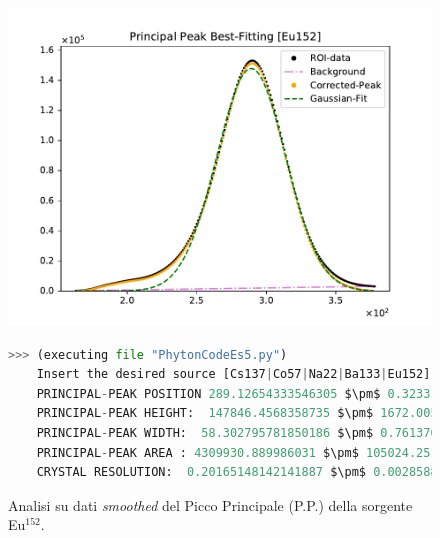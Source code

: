 \begin{figure}[h!]
	\centering
	\caption{Analisi su dati \emph{smoothed} del Picco Principale (P.P.) della sorgente Eu$^{152}$. }
	\includegraphics[width =  \textwidth,trim={1cm 0 1cm 0}, clip]{Immagini/Peak-Fitting_Eu152.pdf}
	\label{fig:PPEu152} \bigskip\bigskip
	\begin{lstlisting}[language=python, style=Pystyle, mathescape=true]
	>>> (executing file "PhytonCodeEs5.py")
	Insert the desired source [Cs137|Co57|Na22|Ba133|Eu152]: Eu152
	PRINCIPAL-PEAK POSITION 289.12654333546305 $\pm$ 0.32331257942848335
	PRINCIPAL-PEAK HEIGHT:  147846.4568358735 $\pm$ 1672.005453919737
	PRINCIPAL-PEAK WIDTH:  58.302795781850186 $\pm$ 0.7613703593365995
	PRINCIPAL-PEAK AREA : 4309930.889986031 $\pm$ 105024.2512468971
	CRYSTAL RESOLUTION:  0.20165148142141887 $\pm$ 0.002858841012675539
	\end{lstlisting}\bigskip\bigskip
\end{figure}

\newpage